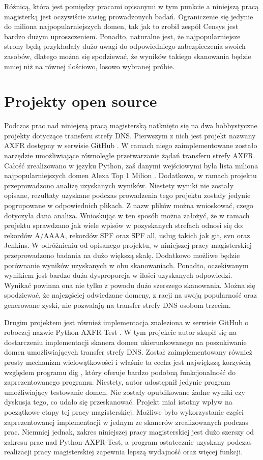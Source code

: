 Różnicą, która jest pomiędzy pracami opisanymi w tym punkcie a niniejszą pracą magisterką jest oczywiście zasięg prowadzonych badań.
Ograniczenie się jedynie do miliona najpopularniejszych domen, tak jak to zrobił zespół Censys \cite{censys} jest bardzo dużym
uproszczeniem. Ponadto, naturalne jest, że najpopularniejsze strony będą przykładały dużo uwagi do odpowiedniego zabezpieczenia
swoich zasobów, dlatego można się spodziewać, że wyników takiego skanowania będzie mniej niż na równej ilościowo, losowo wybranej próbie.

\section{Projekty open source}
\noindent Podczas prac nad niniejszą pracą magisterską natknięto się na dwa hobbystyczne projekty dotyczące transferu strefy DNS. Pierwszym z nich
jest projekt nazwany AXFR dostępny w serwisie GitHub \cite{asg-axfr}. W ramach niego zaimplementowane zostało narzędzie umożliwiające
równoległe przetwarzanie żądań transferu strefy AXFR. Całość zrealizowano w języku Python, zaś danymi wejściowymi była lista miliona
najpopularniejszych domen Alexa Top 1 Milion \cite{alexa}. Dodatkowo, w ramach projektu przeprowadzono analizę uzyskanych wyników.
Niestety wyniki nie zostały opisane, rezultaty uzyskane podczas prowadzenia tego projektu zostały jedynie pogrupowane w odpowiednich
plikach. Z nazw plików można wnioskować, czego dotyczyła dana analiza. Wnioskując w ten sposób można założyć, że w ramach projektu
sprawdzano jak wiele wpisów w pozyskanych strefach odnosi się do: rekordów A/AAAA, rekordów SPF oraz SPF all, usług takich jak git,
svn oraz Jenkins. W odróżnieniu od opisanego projektu, w niniejszej pracy magisterskiej przeprowadzono badania na dużo większą skalę.
Dodatkowo możliwe będzie porównanie wyników uzyskanych w obu skanowaniach. Ponadto, oczekiwanym wynikiem jest bardzo duża dysproporcja
w ilości uzyskanych odpowiedzi. Wynikać powinna ona nie tylko z powodu dużo szerszego skanowania. Można się spodziewać, że
najczęściej odwiedzane domeny, z racji na swoją popularność oraz generowane zyski, nie pozwalają na transfer strefy DNS osobom trzecim.

Drugim projektem jest również implementacja znaleziona w serwisie GitHub o roboczej nazwie Python-AXFR-Test \cite{python_axfr_test}.
W tym projekcie autor skupił się na dostarczeniu implementacji skanera domen ukierunkowanego na poszukiwanie domen umożliwiających
transfer strefy DNS. Został zaimplementowany również prosty mechanizm wielowątkowości i właśnie ta cecha jest największą korzyścią
względem programu dig \cite{dig}, który oferuje bardzo podobną funkcjonalność do zaprezentowanego programu. Niestety, autor udostępnił
jedynie program umożliwiający testowanie domen. Nie zostały opublikowane żadne wyniki czy dyskusja tego, co udało się przeskanować.
Projekt miał istotny wpływ na początkowe etapy tej pracy magisterskiej. Możliwe było wykorzystanie części zaprezentowanej implementacji
w jednym ze skanerów zrealizowanych podczas prac. Niemniej jednak, zakres niniejszej pracy magisterskiej jest dużo szerszy od zakresu
prac nad Python-AXFR-Test, a program ostatecznie uzyskany podczas realizacji pracy magisterskiej zapewnia lepszą wydajność oraz
więcej funkcji.

